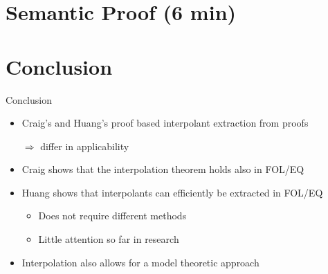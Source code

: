 \documentclass[final,compress]{beamer}
\begin{document}
\section{Semantic Proof (6 min)}
\begin{frame}
\end{frame}

\section{Conclusion}
\begin{frame}{Conclusion}
	\begin{itemize}
		\item Craig's and Huang's proof based interpolant extraction from proofs

			$\Rightarrow$ differ in applicability 

		\item Craig shows that the interpolation theorem holds also in FOL/EQ
		\item Huang shows that interpolants can efficiently be extracted in FOL/EQ

			\begin{itemize}
				\item Does not require different methods
				\item Little attention so far in research
			\end{itemize}

		\item Interpolation also allows for a model theoretic approach

	\end{itemize}
\end{frame}
\end{document}
